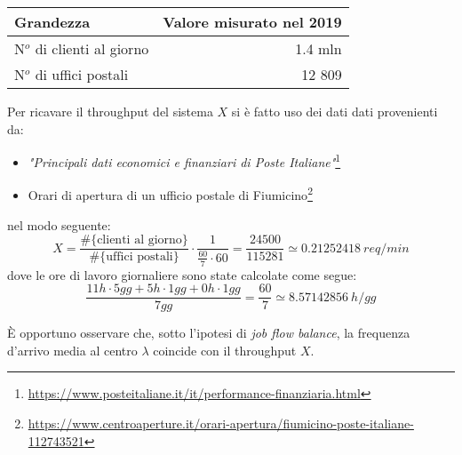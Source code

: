 \begin{table}[ht]
\centering
{\tablecolors
\begin{tabular}{| l | r |}
\hline
Grandezza & Valore misurato nel 2019 \\
\hline
N$^o$ di clienti al giorno & 1.4 mln \\
\hline
N$^o$ di uffici postali & 12 809 \\
\hline
\end{tabular}}
\label{table:modello-specifiche-2}
\end{table}

Per ricavare il throughput del sistema $X$ si è fatto uso dei dati dati provenienti da:
\begin{itemize}
\item \textsl{"Principali dati economici e finanziari di Poste Italiane"}\footnote{\url{https://www.posteitaliane.it/it/performance-finanziaria.html}}
\item Orari di apertura di un ufficio postale di Fiumicino\footnote{\url{https://www.centroaperture.it/orari-apertura/fiumicino-poste-italiane-112743521}}
\end{itemize}
nel modo seguente:
\begin{equation}
X = \frac{\# \lbrace \text{clienti al giorno} \rbrace}{\# \lbrace \text{uffici postali} \rbrace} \cdot \frac{1}{\frac{60}{7} \cdot 60} = \frac{24500}{115281} \simeq 0.21252418\ req/min
\end{equation} 
dove le ore di lavoro giornaliere sono state calcolate come segue:
\begin{equation}
\frac{11h \cdot 5gg + 5h \cdot 1gg + 0h \cdot 1gg}{7gg} = \frac{60}{7} \simeq 8.57142856\ h/gg  
\end{equation}

È opportuno osservare che, sotto l'ipotesi di \textsl{job flow balance}, la frequenza d'arrivo media al centro $\lambda$ coincide con il throughput $X$.


















